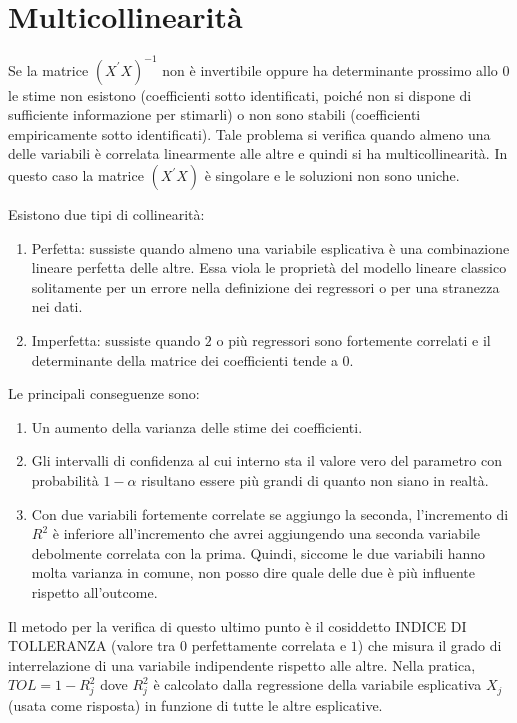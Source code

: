 \documentclass[a4page, 11pt]{article}
\begin{document}
\section{Multicollinearità }

Se la matrice $(X^{\prime} X)^{-1}$ non è invertibile oppure ha determinante prossimo allo 0 le stime non esistono (coefficienti sotto identificati, poiché non si dispone di sufficiente informazione per stimarli) o non sono stabili (coefficienti empiricamente sotto identificati).
Tale problema si verifica quando almeno una delle variabili è correlata linearmente alle altre e quindi si ha multicollinearità. In questo caso la matrice $(X^{\prime} X)$ è singolare e le soluzioni non sono uniche. 

Esistono due tipi di collinearità:
\begin{enumerate}[noitemsep]
\item Perfetta: sussiste quando almeno una variabile esplicativa è una combinazione lineare perfetta delle altre. Essa viola le proprietà del modello lineare classico solitamente per un errore nella definizione dei regressori o per una stranezza nei dati.
\item Imperfetta: sussiste quando $2$ o più regressori sono fortemente correlati e il determinante della matrice dei coefficienti tende a $0$.
\end{enumerate}
Le principali conseguenze sono:
\begin{enumerate}[noitemsep]
\item Un aumento della varianza delle stime dei coefficienti.
\item Gli intervalli di confidenza al cui interno sta il valore vero del parametro con probabilità $1-\alpha$ risultano essere più grandi di quanto non siano in realtà.
\item Con due variabili fortemente correlate se aggiungo la seconda, l’incremento di $R^{2}$ è inferiore all’incremento che avrei aggiungendo una seconda variabile debolmente correlata con la prima. Quindi, siccome le due variabili hanno molta varianza in comune, non posso dire quale delle due è più influente rispetto all’outcome.
\end{enumerate}
Il metodo per la verifica di questo ultimo punto è il cosiddetto INDICE DI TOLLERANZA (valore tra $0$ perfettamente correlata e $1$)%
che misura il grado di interrelazione di una variabile indipendente rispetto alle altre. 
Nella pratica, $TOL = 1 - R^{2}_j$ dove $R^{2}_j$ è calcolato dalla regressione della variabile esplicativa $X_j$ (usata come risposta) in funzione di tutte le altre esplicative.
\end{document}
